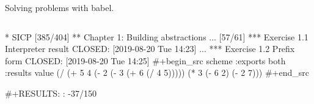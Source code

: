 \documentclass[presentation, CJK, compress,aspectratio=169]{beamer}
\begin{document}
\begin{frame}[label={sec:org98b6881},fragile]{Solving problems with babel.}
 \begin{columns}[t]
\begin{column}{0.80\columnwidth}
\begin{semiverbatim}
* SICP \alert{[385/404]}
** Chapter 1: Building abstractions ... \alert{[57/61]}
***  Exercise 1.1 Interpreter result
    CLOSED:{\color{green!50!black} [2019-08-20 Tue 14:23]} ...
***  Exercise 1.2 Prefix form
    CLOSED:{\color{green!50!black} [2019-08-20 Tue 14:25]}
 {\color{orange!50!black}#+begin_src scheme :exports both :results value}
  (/ (+ 5 4 (- 2 (- 3 (+ 6 (/ 4 5))))) 
     (* 3 (- 6 2) (- 2 7)))
 {\color{orange!50!black}#+end_src}

 {\color{orange!50!black}#+RESULTS:}
 : -37/150
\end{semiverbatim}
\end{column}


\end{columns}
\end{frame}
\end{document}

